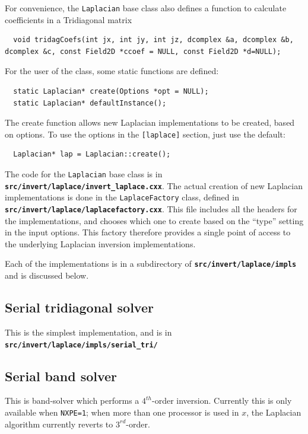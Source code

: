 \documentclass[12pt]{article}
\newcommand{\code}[1]{\texttt{#1}}
\newcommand{\file}[1]{\texttt{\bf #1}}
\begin{document}
For convenience, the \lstinline!Laplacian! base class also defines a function to
calculate coefficients in a Tridiagonal matrix
\begin{lstlisting}
  void tridagCoefs(int jx, int jy, int jz, dcomplex &a, dcomplex &b, dcomplex &c, const Field2D *ccoef = NULL, const Field2D *d=NULL);
\end{lstlisting}

For the user of the class, some static functions are defined:
\begin{lstlisting}
  static Laplacian* create(Options *opt = NULL);
  static Laplacian* defaultInstance();
\end{lstlisting}

The create function allows new Laplacian implementations to be created, based
on options. To use the options in the \texttt{[laplace]} section, just use the default:
\begin{lstlisting}
  Laplacian* lap = Laplacian::create();
\end{lstlisting}

The code for the \lstinline!Laplacian! base class is in \file{src/invert/laplace/invert\_laplace.cxx}. The actual creation of new Laplacian implementations is done in the \lstinline!LaplaceFactory! class, defined in \file{src/invert/laplace/laplacefactory.cxx}. This file includes all the headers for the implementations, and chooses which one to create based on the ``type'' setting in the input options. This factory therefore provides a single point of access to the underlying Laplacian inversion implementations.

Each of the implementations is in a subdirectory of \file{src/invert/laplace/impls} and is
discussed below.


\subsection{Serial tridiagonal solver}

This is the simplest implementation, and is in \file{src/invert/laplace/impls/serial\_tri/}

\subsection{Serial band solver}

This is band-solver which performs a $4^{th}$-order inversion. Currently this
is only available when \code{NXPE=1}; when more than one processor is used in $x$,
the Laplacian algorithm currently reverts to $3^{rd}$-order.
\end{document}
